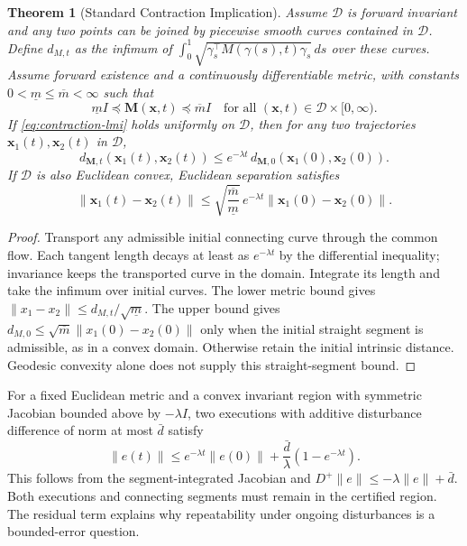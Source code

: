 \documentclass[11pt,letterpaper]{article}
\newtheorem{theorem}{Theorem}[section]
\newcommand{\norm}[1]{\left\lVert #1 \right\rVert}
\newcommand{\M}{\mathbf{M}}
\newcommand{\x}{\mathbf{x}}
\begin{document}
\begin{theorem}[Standard Contraction Implication]
Assume $\mathcal{D}$ is forward invariant and any two points can be joined by piecewise smooth curves contained in $\mathcal D$. Define $d_{M,t}$ as the infimum of $\int_0^1\sqrt{\gamma_s^\top M(\gamma(s),t)\gamma_s}\,ds$ over these curves. Assume forward existence and a continuously differentiable metric, with constants $0<\underline{m}\leq \overline{m}<\infty$ such that
\begin{equation}
\underline{m}I \preceq \M(\x,t) \preceq \overline{m}I
\quad \text{for all } (\x,t)\in\mathcal{D}\times[0,\infty).
\label{eq:metric-bounds}
\end{equation}
If \eqref{eq:contraction-lmi} holds uniformly on $\mathcal{D}$, then for any two trajectories $\x_1(t),\x_2(t)$ in $\mathcal{D}$,
\begin{equation}
d_{\M,t}\!\left(\x_1(t),\x_2(t)\right)
\le e^{-\lambda t}\,d_{\M,0}\!\left(\x_1(0),\x_2(0)\right).
\label{eq:geodesic-decay}
\end{equation}
If $\mathcal D$ is also Euclidean convex, Euclidean separation satisfies
\begin{equation}
\norm{\x_1(t)-\x_2(t)}
\le \sqrt{\frac{\overline{m}}{\underline{m}}}\,e^{-\lambda t}
\norm{\x_1(0)-\x_2(0)}.
\label{eq:euclidean-decay}
\end{equation}
\end{theorem}

\begin{proof}
Transport any admissible initial connecting curve through the common flow. Each tangent length decays at least as $e^{-\lambda t}$ by the differential inequality; invariance keeps the transported curve in the domain. Integrate its length and take the infimum over initial curves. The lower metric bound gives $\|x_1-x_2\|\leq d_{M,t}/\sqrt{\underline m}$. The upper bound gives $d_{M,0}\leq\sqrt{\overline m}\|x_1(0)-x_2(0)\|$ only when the initial straight segment is admissible, as in a convex domain. Otherwise retain the initial intrinsic distance. Geodesic convexity alone does not supply this straight-segment bound.
\end{proof}

For a fixed Euclidean metric and a convex invariant region with symmetric Jacobian bounded above by $-\lambda I$, two executions with additive disturbance difference of norm at most $\bar d$ satisfy
\[
\|e(t)\|\leq e^{-\lambda t}\|e(0)\|
 +\frac{\bar d}{\lambda}(1-e^{-\lambda t}).
\]
This follows from the segment-integrated Jacobian and $D^+\|e\|\leq-\lambda\|e\|+\bar d$. Both executions and connecting segments must remain in the certified region. The residual term explains why repeatability under ongoing disturbances is a bounded-error question.
\end{document}
